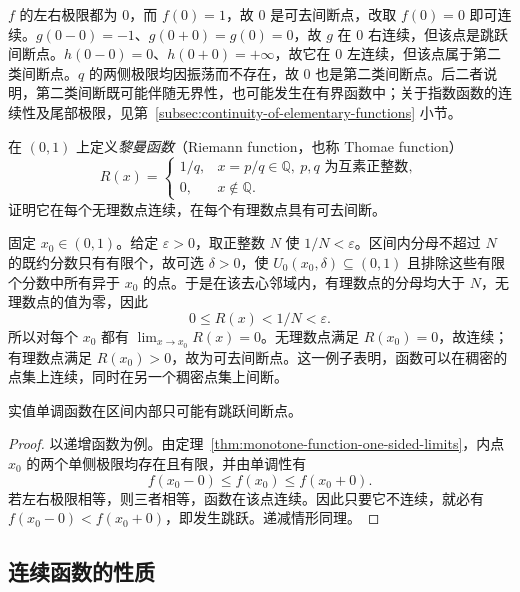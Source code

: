 \begin{solve}
$f$ 的左右极限都为 $0$，而 $f(0)=1$，故 $0$ 是可去间断点，改取 $f(0)=0$ 即可连续。$g(0-0)=-1$、$g(0+0)=g(0)=0$，故 $g$ 在 $0$ 右连续，但该点是跳跃间断点。$h(0-0)=0$、$h(0+0)=+\infty$，故它在 $0$ 左连续，但该点属于第二类间断点。$q$ 的两侧极限均因振荡而不存在，故 $0$ 也是第二类间断点。后二者说明，第二类间断既可能伴随无界性，也可能发生在有界函数中；关于指数函数的连续性及尾部极限，见第~\ref{subsec:continuity-of-elementary-functions} 小节。
\end{solve}

\begin{example}
\label{ex:riemann-function-continuity}
在 $(0,1)$ 上定义\emph{黎曼函数}（Riemann function，也称 Thomae function）
\[
    R(x)=\begin{cases}
        1/q,&x=p/q\in\mathbb{Q},\ p,q\text{ 为互素正整数},\\
        0,&x\notin\mathbb{Q}.
    \end{cases}
\]
证明它在每个无理数点连续，在每个有理数点具有可去间断。
\end{example}

\begin{solve}
固定 $x_0\in(0,1)$。给定 $\varepsilon>0$，取正整数 $N$ 使 $1/N<\varepsilon$。区间内分母不超过 $N$ 的既约分数只有有限个，故可选 $\delta>0$，使 $U_0(x_0,\delta)\subseteq(0,1)$ 且排除这些有限个分数中所有异于 $x_0$ 的点。于是在该去心邻域内，有理数点的分母均大于 $N$，无理数点的值为零，因此
\[
    0\leq R(x)<1/N<\varepsilon.
\]
所以对每个 $x_0$ 都有 $\lim_{x\to x_0}R(x)=0$。无理数点满足 $R(x_0)=0$，故连续；有理数点满足 $R(x_0)>0$，故为可去间断点。这一例子表明，函数可以在稠密的点集上连续，同时在另一个稠密点集上间断。
\end{solve}

\begin{proposition}[单调函数的间断类型]
\label{prop:monotone-function-discontinuities}
实值单调函数在区间内部只可能有跳跃间断点。
\end{proposition}

\begin{proof}
以递增函数为例。由定理~\ref{thm:monotone-function-one-sided-limits}，内点 $x_0$ 的两个单侧极限均存在且有限，并由单调性有
\[
    f(x_0-0)\leq f(x_0)\leq f(x_0+0).
\]
若左右极限相等，则三者相等，函数在该点连续。因此只要它不连续，就必有 $f(x_0-0)<f(x_0+0)$，即发生跳跃。递减情形同理。
\end{proof}

\subsection{连续函数的性质}
\label{subsec:properties-of-continuous-functions}

